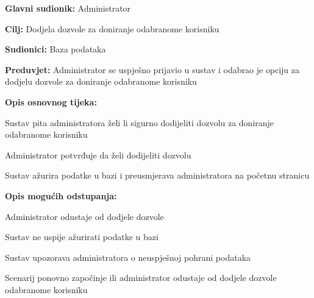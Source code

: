 					\noindent {}
					\begin{packed_item}
	
						\item \textbf{Glavni sudionik: }Administrator
						\item  \textbf{Cilj:} Dodjela dozvole za doniranje odabranome korisniku
						\item  \textbf{Sudionici:} Baza podataka
						\item  \textbf{Preduvjet:} Administrator se uspješno prijavio u sustav i odabrao je opciju za dodjelu dozvole za doniranje odabranome korisniku
						\item  \textbf{Opis osnovnog tijeka:}
						
						\item[] \begin{packed_enum}
							\item Sustav pita administratora želi li sigurno dodijeliti dozvolu za doniranje odabranome korisniku
							\item Administrator potvrđuje da želi dodijeliti dozvolu
							\item Sustav ažurira podatke u bazi i preusmjerava administratora na početnu stranicu
						\end{packed_enum}

						\item  \textbf{Opis mogućih odstupanja:}

						\item[] \begin{packed_item}
							\item[2.a] Administrator odustaje od dodjele dozvole
							\item[3.a] Sustav ne uspije ažurirati podatke u bazi
							\item[] \begin{packed_enum}
								\item Sustav upozorava administratora o neuspješnoj pohrani podataka
								\item Scenarij ponovno započinje ili administrator odustaje od dodjele dozvole odabranome korisniku
							\end{packed_enum}					
						\end{packed_item}
					\end{packed_item}

